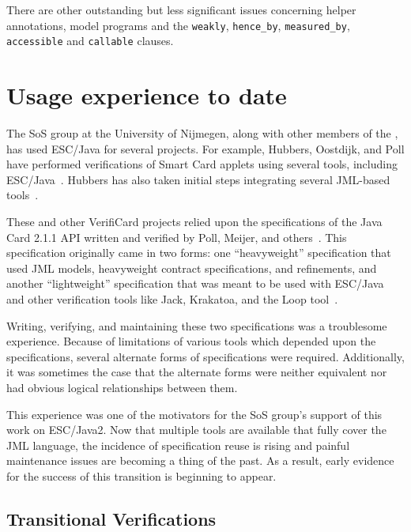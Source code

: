 \documentclass{llncs}
\begin{document}
There are other outstanding but less significant issues concerning
helper annotations, model programs and the \texttt{weakly},
\texttt{hence\_by}, \texttt{measured\_by}, \texttt{accessible} and
\texttt{callable} clauses.

\section{Usage experience to date}
\label{sec:usage-exper-date}
The SoS group at the University of Nijmegen, along with other members
of the , has used ESC/Java for several
projects.  For example, Hubbers, Oostdijk, and Poll have performed
verifications of Smart Card applets using several tools, including
ESC/Java~\cite{HOP04}.  Hubbers has also taken initial steps
integrating several JML-based tools~\cite{Hub03}.

These and other VerifiCard projects relied upon the specifications of
the Java Card 2.1.1 API written and verified by Poll, Meijer, and
others~\cite{MeijerPoll01}.  This specification originally came in two
forms: one ``heavyweight'' specification that used JML models,
heavyweight contract specifications, and refinements, and another
``lightweight'' specification that was meant to be used with ESC/Java
and other verification tools like Jack, Krakatoa, and the Loop
tool~\cite{BergJ01,BurdyRequet02,MarchePaulinMohringUrbain04}.

Writing, verifying, and maintaining these two specifications was a
troublesome experience.  Because of limitations of various tools which
depended upon the specifications, several alternate forms of
specifications were required.  Additionally, it was sometimes the case
that the alternate forms were neither equivalent nor had obvious
logical relationships between them.

This experience was one of the motivators for the SoS group's support
of this work on ESC/Java2.  Now that multiple tools are available that
fully cover the JML language, the incidence of specification reuse is
rising and painful maintenance issues are becoming a thing of the
past.  As a result, early evidence for the success of this transition
is beginning to appear.

\subsection{Transitional Verifications}
\end{document}
